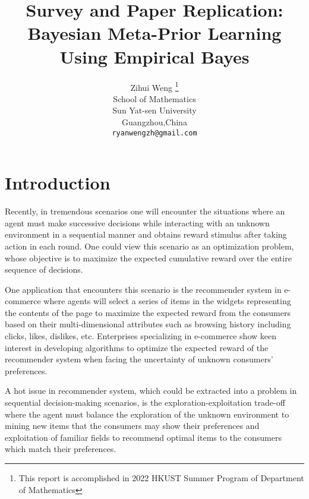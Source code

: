 \documentclass{article}
\title{Survey and Paper Replication: Bayesian Meta-Prior Learning Using Empirical Bayes}
\author{%
  Zihui Weng \thanks{This report is accomplished in 2022 HKUST Summer Program of Department of Mathematics} \\
  School of Mathematics\\
  Sun Yat-sen University\\
  Guangzhou,China \\
  \texttt{ryanwengzh@gmail.com} \\
}
\begin{document}
\maketitle


\begin{abstract}
  
\end{abstract}


\section{Introduction}
Recently, in tremendous scenarios one will encounter the situations where an agent must make successive decisions while interacting with an unknown environment in a sequential manner and obtains reward stimulus after taking action in each round. One could view this scenario as an optimization problem, whose objective is to maximize the expected cumulative reward over the entire sequence of decisions. 

One application that encounters this scenario is the recommender system in e-commerce where agents will select a series of items in the widgets representing the contents of the page to maximize the expected reward from the consumers based on their multi-dimensional attributes such as browsing history including clicks, likes, dislikes, etc. Enterprises specializing in e-commerce show keen interest in developing algorithms to optimize the expected reward of the recommender system when facing the uncertainty of unknown consumers' preferences.

A hot issue in recommender system, which could be extracted into a problem in sequential decision-making scenarios, is the exploration-exploitation trade-off where the agent must balance the exploration of the unknown environment to mining new items that the consumers may show their preferences and exploitation of familiar fields to recommend optimal items to the consumers which match their preferences. 
\end{document}
